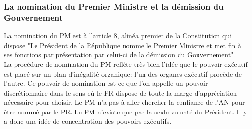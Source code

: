 \documentclass[12pt, a4paper, openany]{book}
\begin{document}
\subsubsection{La nomination du Premier Ministre et la démission du Gouvernement}

La nomination du PM est à l'article 8, alinéa premier de la Constitution qui dispose "Le Président de la République nomme le Premier Ministre et met fin à ses fonctions par présentation par celui-ci de la démission du Gouvernement". \\
La procédure de nomination du PM reflète très bien l'idée que le pouvoir exécutif est placé sur un plan d'inégalité organique: l'un des organes exécutif procède de l'autre. Ce pouvoir de nomination est ce que l'on appelle un pouvoir discrétionnaire dans le sens où le PR dispose de toute la marge d'appréciation nécessaire pour choisir. Le PM n'a pas à aller chercher la confiance de l'AN pour être nommé par le PR. Le PM n'existe que par la seule volonté du Président. Il y a donc une idée de concentration des pouvoirs exécutifs. 
\end{document}
